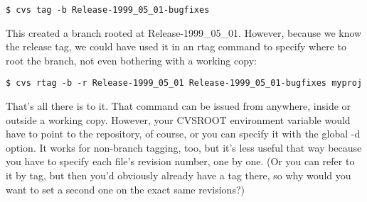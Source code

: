 \begin{verbatim}
$ cvs tag -b Release-1999_05_01-bugfixes
\end{verbatim}

This created a branch rooted at Release-1999\_05\_01. However, because we know the release tag, we could have used it in an rtag command to specify where to root the branch, not even bothering with a working copy: 

\begin{verbatim}
$ cvs rtag -b -r Release-1999_05_01 Release-1999_05_01-bugfixes myproj
\end{verbatim}

That's all there is to it. That command can be issued from anywhere, inside or outside a working copy. However, your CVSROOT environment variable would have to point to the repository, of course, or you can specify it with the global -d option. It works for non-branch tagging, too, but it's less useful that way because you have to specify each file's revision number, one by one. (Or you can refer to it by tag, but then you'd obviously already have a tag there, so why would you want to set a second one on the exact same revisions?) 
